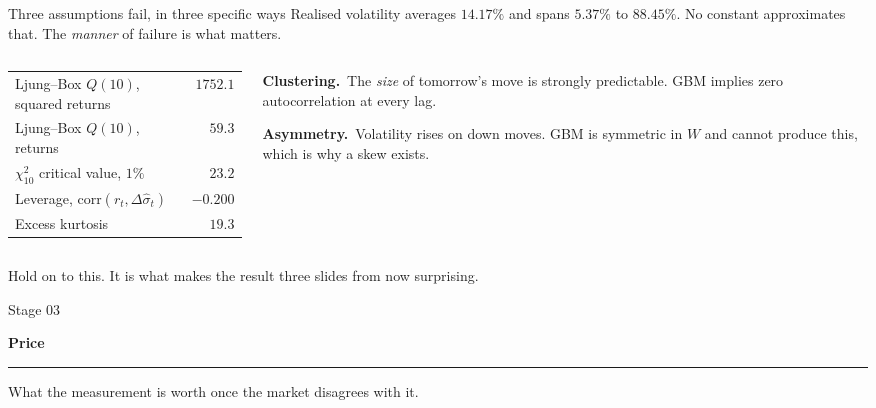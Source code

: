 \documentclass[aspectratio=169,11pt]{beamer}
\newcommand{\lead}[1]{{\sffamily\bfseries\color{accent}#1}}
\newcommand{\divider}[3]{%
{\setbeamertemplate{footline}{}
\begin{frame}
\vfill
{\sffamily\scriptsize\color{accent}Stage #1}\par\vspace{0.3em}
{\sffamily\bfseries\Huge\color{ink}#2}\par\vspace{0.6em}
{\color{rule}\rule{0.42\textwidth}{0.6pt}}\par\vspace{0.5em}
{\color{muted}#3}
\vfill
\end{frame}}}
\begin{document}
\begin{frame}{Three assumptions fail, in three specific ways}
Realised volatility averages $14.17\%$ and spans $5.37\%$ to $88.45\%$. No constant
approximates that. The \emph{manner} of failure is what matters.
\vspace{0.5em}
\begin{columns}[T]
\begin{column}{0.46\textwidth}
\small
\begin{tabular}{@{}lr@{}}
\toprule
Ljung--Box $Q(10)$, squared returns & $\mathbf{1752.1}$\\
Ljung--Box $Q(10)$, returns & $59.3$\\
$\chi^2_{10}$ critical value, $1\%$ & $23.2$\\
\addlinespace
Leverage, $\mathrm{corr}(r_t,\Delta\hat\sigma_t)$ & $\mathbf{-0.200}$\\
Excess kurtosis & $19.3$\\
\bottomrule
\end{tabular}
\end{column}
\begin{column}{0.50\textwidth}
\small
\lead{Clustering.}\ The \emph{size} of tomorrow's move is strongly predictable. GBM implies
zero autocorrelation at every lag.
\vspace{0.5em}

\lead{Asymmetry.}\ Volatility rises on down moves. GBM is symmetric in $W$ and cannot produce
this, which is why a skew exists.
\end{column}
\end{columns}
\vspace{0.7em}
{\color{muted}Hold on to this. It is what makes the result three slides from now surprising.}
\end{frame}

\divider{03}{Price}{What the measurement is worth once the market disagrees with it.}
\end{document}
